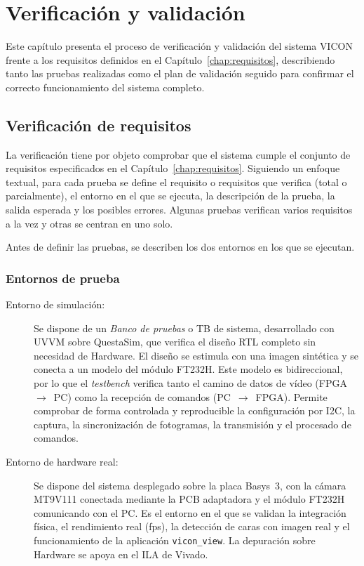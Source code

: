 \documentclass[../main.tex]{subfiles}
\begin{document}
\chapter{Verificación y validación}
\label{chap:resultados}

Este capítulo presenta el proceso de verificación y validación del sistema \ac{VICON} frente a los requisitos definidos en el Capítulo~\ref{chap:requisitos}, describiendo tanto las pruebas realizadas como el plan de validación seguido para confirmar el correcto funcionamiento del sistema completo.

\section{Verificación de requisitos}
\label{sec:verificacion}

La verificación tiene por objeto comprobar que el sistema cumple el conjunto de requisitos especificados en el Capítulo~\ref{chap:requisitos}. Siguiendo un enfoque textual, para cada prueba se define el requisito o requisitos que verifica (total o parcialmente), el entorno en el que se ejecuta, la descripción de la prueba, la salida esperada y los posibles errores. Algunas pruebas verifican varios requisitos a la vez y otras se centran en uno solo.

Antes de definir las pruebas, se describen los dos entornos en los que se ejecutan.

\subsection{Entornos de prueba}
\label{subsec:entornos}
\begin{description}
    \item[Entorno de simulación:] Se dispone de un \emph{Banco de pruebas} o \ac{TB} de sistema, desarrollado con \ac{UVVM} sobre QuestaSim, que verifica el diseño RTL completo sin necesidad de Hardware. El diseño se estimula con una imagen sintética y se conecta a un modelo del módulo FT232H. Este modelo es bidireccional, por lo que el \emph{testbench} verifica tanto el camino de datos de vídeo (FPGA~$\rightarrow$~PC) como la recepción de comandos (PC~$\rightarrow$~FPGA). Permite comprobar de forma controlada y reproducible la configuración por I2C, la captura, la sincronización de fotogramas, la transmisión y el procesado de comandos.
    \item[Entorno de hardware real:] Se dispone del sistema desplegado sobre la placa Basys~3, con la cámara MT9V111 conectada mediante la PCB adaptadora y el módulo FT232H comunicando con el PC. Es el entorno en el que se validan la integración física, el rendimiento real (fps), la detección de caras con imagen real y el funcionamiento de la aplicación \texttt{vicon\_view}. La depuración sobre Hardware se apoya en el ILA de Vivado.
\end{description}
\end{document}
